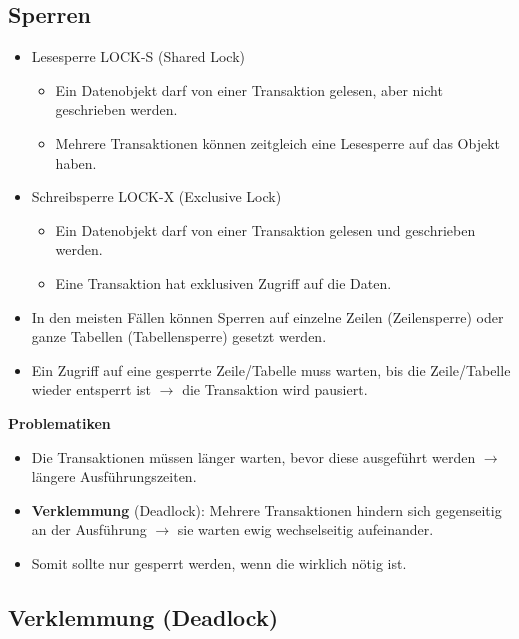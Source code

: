 \documentclass[a4paper, 11pt, accentcolor = tud3b]{tudreport}
\begin{document}
            \subsection{Sperren} %
                \begin{itemize}
                	\item Lesesperre LOCK-S (Shared Lock)
                		\begin{itemize}
                			\item Ein Datenobjekt darf von einer Transaktion gelesen, aber nicht geschrieben werden.
                			\item Mehrere Transaktionen können zeitgleich eine Lesesperre auf das Objekt haben.
                		\end{itemize}
                	\item Schreibsperre LOCK-X (Exclusive Lock)
                		\begin{itemize}
                			\item Ein Datenobjekt darf von einer Transaktion gelesen und geschrieben werden.
                			\item Eine Transaktion hat exklusiven Zugriff auf die Daten.
                		\end{itemize}
                	\item In den meisten Fällen können Sperren auf einzelne Zeilen (Zeilensperre) oder ganze Tabellen (Tabellensperre) gesetzt werden.
                	\item Ein Zugriff auf eine gesperrte Zeile/Tabelle muss warten, bis die Zeile/Tabelle wieder entsperrt ist \(\rightarrow\) die Transaktion wird pausiert.
                \end{itemize}
            
            	\textbf{Problematiken}
            	\begin{itemize}
            		\item Die Transaktionen müssen länger warten, bevor diese ausgeführt werden \(\rightarrow\) längere Ausführungszeiten.
            		\item \textbf{Verklemmung} (Deadlock): Mehrere Transaktionen hindern sich gegenseitig an der Ausführung \(\rightarrow\) sie warten ewig wechselseitig aufeinander.
            		\item Somit sollte nur gesperrt werden, wenn die wirklich nötig ist.
            	\end{itemize}

            \subsection{Verklemmung (Deadlock)} %
            	\label{sec:deadlock}
            
\end{document}
